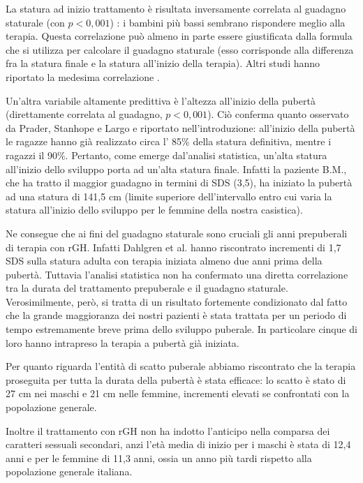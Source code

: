 La statura ad inizio trattamento è risultata inversamente correlata al guadagno staturale (con $p < 0,001$) : i bambini più bassi sembrano rispondere meglio alla terapia. Questa correlazione può almeno in parte essere giustificata dalla formula che si utilizza per calcolare il guadagno staturale (esso corrisponde alla differenza fra la statura finale e la statura all'inizio della terapia). Altri studi hanno riportato la medesima correlazione\cite{de2005growth} \cite{de2000growth}.

Un'altra variabile altamente predittiva è l'altezza all'inizio della pubertà (direttamente correlata al guadagno, $p < 0,001$). Ciò conferma quanto osservato da Prader\cite{gasser1985human}, Stanhope\cite{stanhope1988new} e Largo \cite{gasser2001growth} e riportato nell'introduzione: 
 all'inizio della pubertà le ragazze hanno già realizzato circa l' 85\% della statura definitiva, mentre i ragazzi il 90\%. Pertanto, come emerge dal'analisi statistica, un'alta statura all'inizio dello sviluppo porta ad un'alta statura finale. Infatti la paziente B.M., che ha tratto il maggior guadagno in termini di SDS (3,5), ha iniziato la pubertà ad una statura di 141,5 cm (limite superiore dell'intervallo entro cui varia la statura all'inizio dello sviluppo per le femmine della nostra casistica).
 
Ne consegue che ai fini del guadagno staturale sono cruciali gli anni prepuberali di terapia con rGH. Infatti Dahlgren et al. hanno riscontrato incrementi di 1,7 SDS sulla statura adulta con terapia iniziata almeno due anni prima della pubertà\cite{dahlgren2005final}. Tuttavia l'analisi statistica non ha confermato una diretta correlazione tra la durata del trattamento prepuberale e il guadagno staturale. Verosimilmente, però, si tratta di un risultato fortemente condizionato dal fatto che la grande maggioranza dei nostri pazienti è stata trattata per un periodo di tempo estremamente breve prima dello sviluppo puberale. In particolare cinque di loro hanno intrapreso la terapia a pubertà già iniziata.

Per quanto riguarda l'entità di scatto puberale abbiamo riscontrato che la terapia proseguita per tutta la durata della pubertà è stata efficace: lo scatto è stato di 27 cm nei maschi e 21 cm nelle femmine, incrementi elevati se confrontati con la popolazione generale\cite{tanner1990foetus}. 

Inoltre il trattamento con rGH non ha indotto l'anticipo nella comparsa dei caratteri sessuali secondari, anzi l'età media di inizio per i maschi è stata di 12,4 anni e per le femmine di 11,3 anni, ossia un anno più tardi rispetto alla popolazione generale italiana\cite{benso1989distribution}.

